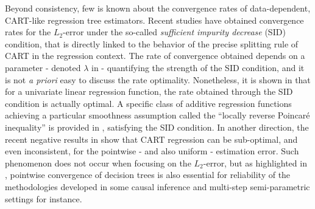 \documentclass[paper=a4, fontsize=11pt]{scrartcl}
\begin{document}
Beyond consistency, few is known about the convergence rates of data-dependent, CART-like regression tree estimators. Recent studies  \cite{chi2022asymptotic, mazumder2024convergence} have obtained convergence rates for the $L_2$-error under the so-called \textit{sufficient impurity decrease} (SID) condition, that is directly linked to the behavior of the precise splitting rule of CART in the regression context. The rate of convergence obtained depends on a parameter - denoted $\lambda$ in \cite{ mazumder2024convergence} - quantifying the strength of the SID condition, and it is not \textit{a priori} easy to discuss the rate optimality. Nonetheless, it is shown in  \cite{ mazumder2024convergence} that for a univariate linear regression function, the rate obtained through the SID condition is actually optimal. A specific class of additive regression functions achieving a particular smoothness assumption called the ``locally reverse Poincaré inequality'' is provided in  \cite{ mazumder2024convergence}, satisfying the SID condition. In another direction, the recent negative results in \cite{cattaneo2022pointwise} show that CART regression can be sub-optimal, and even inconsistent, for the pointwise - and also uniform - estimation error. Such phenomenon does not occur when focusing on the $L_2$-error, but as highlighted in \cite{cattaneo2022pointwise}, pointwise convergence of decision trees is also essential for reliability of the methodologies developed in some causal inference and multi-step semi-parametric settings for instance. 


\end{document}
